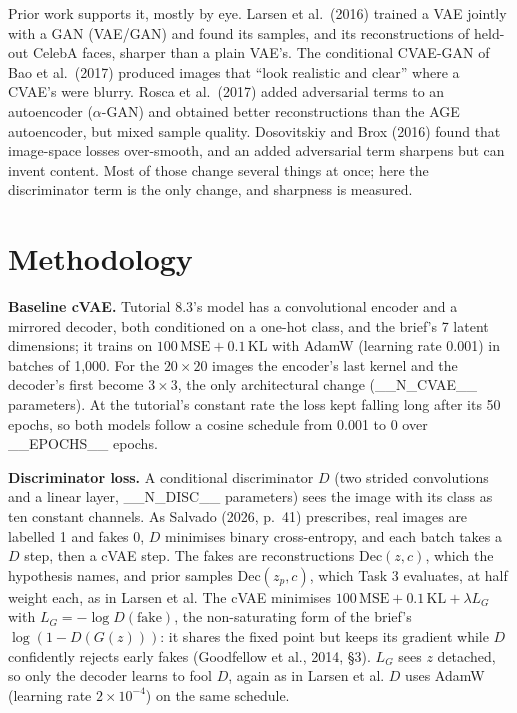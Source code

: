\documentclass[10pt,a4paper,twocolumn]{article}
\begin{document}
Prior work supports it, mostly by eye. Larsen et al.\ (2016) trained a VAE jointly with a GAN
(VAE/GAN) and found its samples, and its reconstructions of held-out CelebA faces, sharper than a
plain VAE's. The conditional CVAE-GAN of Bao et al.\ (2017) produced images that ``look realistic
and clear'' where a CVAE's were blurry. Rosca et al.\ (2017) added adversarial terms to an
autoencoder ($\alpha$-GAN) and obtained better reconstructions than the AGE autoencoder, but
mixed sample quality. Dosovitskiy and Brox (2016) found that image-space losses
over-smooth, and an added adversarial term sharpens but can invent content. Most of those change
several things at once; here the discriminator term is the only change, and sharpness is measured.

\section{Methodology}
\textbf{Baseline cVAE.} Tutorial 8.3's model has a convolutional encoder and a mirrored decoder,
both conditioned on a one-hot class, and the brief's 7 latent dimensions; it trains on
$100\,\mathrm{MSE} + 0.1\,\mathrm{KL}$ with AdamW (learning rate 0.001) in batches of 1,000. For
the $20\times20$ images the encoder's last kernel and the decoder's first become $3\times3$, the
only architectural change (__N_CVAE__ parameters). At the tutorial's constant rate the loss kept
falling long after its 50 epochs, so both models follow a cosine schedule from 0.001 to 0 over
__EPOCHS__ epochs.

\textbf{Discriminator loss.} A conditional discriminator $D$ (two strided convolutions and a
linear layer, __N_DISC__ parameters) sees the image with its class as ten constant channels. As
Salvado (2026, p.~41) prescribes, real images are labelled 1 and fakes 0, $D$ minimises binary
cross-entropy, and each batch takes a $D$ step, then a cVAE step. The fakes are reconstructions
$\mathrm{Dec}(z, c)$, which the hypothesis names, and prior samples $\mathrm{Dec}(z_p, c)$, which
Task 3 evaluates, at half weight each, as in Larsen et al. The cVAE minimises
$100\,\mathrm{MSE} + 0.1\,\mathrm{KL} + \lambda L_G$ with $L_G = -\log D(\mathrm{fake})$, the
non-saturating form of the brief's $\log(1 - D(G(z)))$: it shares the fixed point but keeps its
gradient while $D$ confidently rejects early fakes (Goodfellow et al., 2014, \S3). $L_G$ sees $z$
detached, so only the decoder learns to fool $D$, again as in Larsen et al. $D$ uses AdamW
(learning rate $2\times10^{-4}$) on the same schedule.
\end{document}
